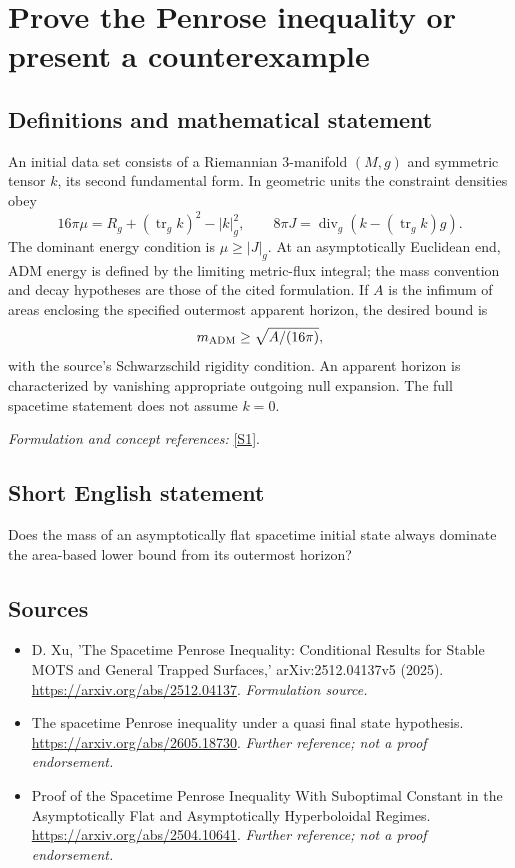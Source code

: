 \documentclass[11pt]{article}
\begin{document}
\section*{\texorpdfstring{Prove the Penrose inequality or present a counterexample}{Prove the Penrose inequality or present a counterexample}}\label{30006689}
\subsection{Definitions and mathematical statement}
An initial data set consists of a Riemannian $3$-manifold $(M,g)$ and symmetric tensor $k$, its second fundamental form. In geometric units the constraint densities obey
\[
 16\pi\mu=R_g+(\operatorname{tr}_gk)^2-|k|_g^2,\qquad
 8\pi J=\operatorname{div}_g(k-(\operatorname{tr}_gk)g).
\]
The dominant energy condition is $\mu\ge|J|_g$. At an asymptotically Euclidean end, ADM energy is defined by the limiting metric-flux integral; the mass convention and decay hypotheses are those of the cited formulation. If $A$ is the infimum of areas enclosing the specified outermost apparent horizon, the desired bound is
\[
 m_{\rm ADM}\ge\sqrt{A/(16\pi)},
\]
with the source's Schwarzschild rigidity condition. An apparent horizon is characterized by vanishing appropriate outgoing null expansion. The full spacetime statement does not assume $k=0$.
\par\smallskip\textit{Formulation and concept references:} \href{https://arxiv.org/abs/2512.04137}{[S1]}.

\subsection{Short English statement}
Does the mass of an asymptotically flat spacetime initial state always dominate the area-based lower bound from its outermost horizon?
\subsection{Sources}
\begin{itemize}
\item[S1]D. Xu, 'The Spacetime Penrose Inequality: Conditional Results for Stable MOTS and General Trapped Surfaces,' arXiv:2512.04137v5 (2025).
\url{https://arxiv.org/abs/2512.04137}.
\textit{Formulation source.}
\item[S2]The spacetime Penrose inequality under a quasi final state hypothesis.
\url{https://arxiv.org/abs/2605.18730}.
\textit{Further reference; not a proof endorsement.}
\item[S3]Proof of the Spacetime Penrose Inequality With Suboptimal Constant in the Asymptotically Flat and Asymptotically Hyperboloidal Regimes.
\url{https://arxiv.org/abs/2504.10641}.
\textit{Further reference; not a proof endorsement.}
\end{itemize}
\end{document}
